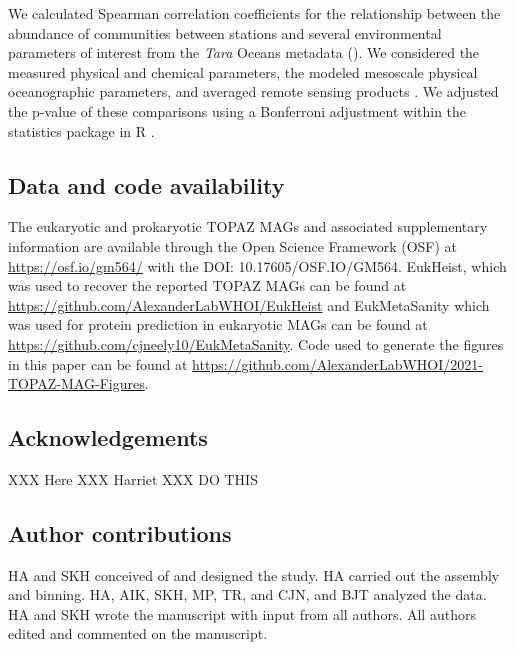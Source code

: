 \documentclass[12pt]{article}
\numberwithin{equation}{section}
\begin{document}
We calculated Spearman correlation coefficients for the relationship between the abundance of communities between stations and several environmental parameters of interest from the \textit{Tara} Oceans metadata \citep{Pesant_2015, taraoceansconsortium2016ecoa} (). We considered the measured physical and chemical parameters, the modeled mesoscale physical oceanographic parameters, and averaged remote sensing products \citep{taraoceansconsortium2016ecoa, d_Ovidio_2010, Pesant_2015}. We adjusted the p-value of these comparisons using a Bonferroni adjustment within the statistics package in R \citep{teamr}. 

\subsection*{Data and code availability}
The eukaryotic and prokaryotic TOPAZ MAGs and associated supplementary information are available through the Open Science Framework (OSF) at \url{https://osf.io/gm564/} with the DOI: 10.17605/OSF.IO/GM564. EukHeist, which was used to recover the reported TOPAZ MAGs can be found at \url{https://github.com/AlexanderLabWHOI/EukHeist} and EukMetaSanity which was used for protein prediction in eukaryotic MAGs can be found at \url{https://github.com/cjneely10/EukMetaSanity}. Code used to generate the figures in this paper can be found at \url{https://github.com/AlexanderLabWHOI/2021-TOPAZ-MAG-Figures}. 

\subsection*{Acknowledgements}
XXX Here XXX Harriet XXX DO THIS

\subsection*{Author contributions}
HA and SKH conceived of and designed the study. HA carried out the assembly and binning. HA, AIK, SKH, MP, TR, and CJN, and BJT analyzed the data. HA and SKH wrote the manuscript with input from all authors. All authors edited and commented on the manuscript.



\end{document}
